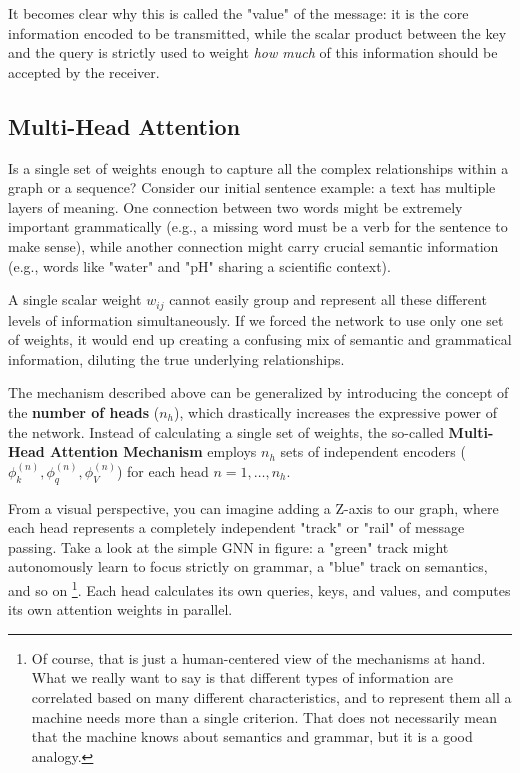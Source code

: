 It becomes clear why this is called the "value" of the message: it is the core information encoded to be transmitted, while the scalar product between the key and the query is strictly used to weight \textit{how much} of this information should be accepted by the receiver.

\subsection{Multi-Head Attention}

Is a single set of weights enough to capture all the complex relationships within a graph or a sequence? Consider our initial sentence example: a text has multiple layers of meaning. One connection between two words might be extremely important grammatically (e.g., a missing word must be a verb for the sentence to make sense), while another connection might carry crucial semantic information (e.g., words like "water" and "pH" sharing a scientific context). 

A single scalar weight $w_{ij}$ cannot easily group and represent all these different levels of information simultaneously. If we forced the network to use only one set of weights, it would end up creating a confusing mix of semantic and grammatical information, diluting the true underlying relationships.

The mechanism described above can be generalized by introducing the concept of the \textbf{number of heads} ($n_h$), which drastically increases the expressive power of the network. Instead of calculating a single set of weights, the so-called \textbf{Multi-Head Attention Mechanism} employs $n_h$ sets of independent encoders ($\phi_k^{(n)}, \phi_q^{(n)}, \phi_V^{(n)}$) for each head $n = 1, \dots, n_h$. 

From a visual perspective, you can imagine adding a Z-axis to our graph, where each head represents a completely independent "track" or "rail" of message passing. Take a look at the simple GNN in figure: a "green" track might autonomously learn to focus strictly on grammar, a "blue" track on semantics, and so on \footnote{Of course, that is just a human-centered view of the mechanisms at hand. What we really want to say is that different types of information are correlated based on many different characteristics, and to represent them all a machine needs more than a single criterion. That does not necessarily mean that the machine knows about semantics and grammar, but it is a good analogy.}. Each head calculates its own queries, keys, and values, and computes its own attention weights in parallel.

